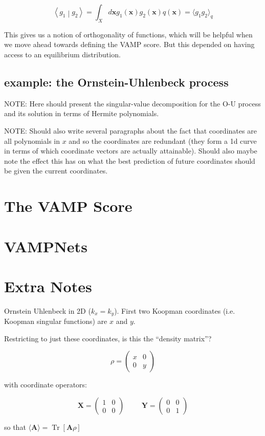 \documentclass[]{article}
\newcommand{\braket}[2]{\left\langle #1 \middle| #2 \right\rangle}
\newcommand{\bk}[1]{\left[ #1 \right]}
\newcommand{\w}[1]{\mathbf{#1}}
\DeclareMathOperator\Tr{Tr}
\begin{document}
$$
\braket{g_1}{g_2} = \int_X d\w{x} g_1(\w{x}) g_2(\w{x}) q(\w{x}) = \langle g_1 g_2 \rangle_q
$$

This gives us a notion of orthogonality of functions, which will be helpful when we move ahead towards defining the VAMP score. But this depended on having access to an equilibrium distribution.

\subsection{example: the Ornstein-Uhlenbeck process}


NOTE: Here should present the singular-value decomposition for the O-U process and its solution in terms of Hermite polynomials.

NOTE: Should also write several paragraphs about the fact that coordinates are all polynomials in $x$ and so the coordinates are redundant (they form a 1d curve in terms of which coordinate vectors are actually attainable). Should also maybe note the effect this has on what the best prediction of future coordinates should be given the current coordinates.

\section{The VAMP Score}
\section{VAMPNets}
\section{Extra Notes}

Ornstein Uhlenbeck in 2D ($k_x=k_y$). First two Koopman coordinates (i.e. Koopman singular functions) are $x$ and $y$.

Restricting to just these coordinates, is this the ``density matrix''?

$$
\rho=\begin{pmatrix}
	x & 0 \\
	0 & y
\end{pmatrix}
$$

with coordinate operators:

$$
\w{X} = \begin{pmatrix}
	1 & 0 \\
	0 & 0
\end{pmatrix}
\hspace{1cm}
\w{Y} = \begin{pmatrix}
	0 & 0 \\
	0 & 1
\end{pmatrix}
$$

so that $\langle \w{A} \rangle = \Tr\bk{\w{A}\rho}$
\end{document}
